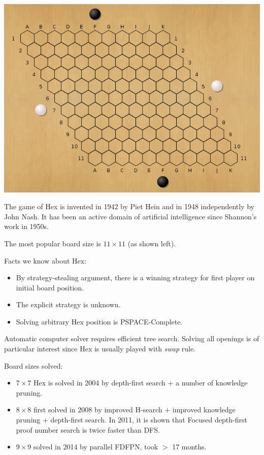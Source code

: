 \documentclass[a0,portrait]{a0poster}
\begin{document}
\begin{multicols}{3}
\begin{minipage}{0.5\linewidth}
\includegraphics[scale=0.5]{hexboard.png} \\
\end{minipage}
\begin{minipage}{0.5\linewidth}
The game of Hex is invented in 1942 by Piet Hein and in 1948 independently by John Nash. It has been an active domain of artificial intelligence since Shannon's work in 1950s.

The most popular board size is $11\times 11$ (as shown left).
\end{minipage}
Facts we know about Hex:
\begin{itemize}
\item By strategy-stealing argument, there is a winning strategy for first player on initial board position.
\item The explicit strategy is unknown.
\item Solving arbitrary Hex position is PSPACE-Complete.
\end{itemize}

Automatic computer solver requires efficient tree search. 
Solving all openings is of particular interest since Hex is usually played with \emph{swap} rule.

Board sizes solved:
\begin{itemize}
\item $7\times 7$ Hex is solved in 2004 by depth-first search + a number of knowledge pruning. 
\item $8 \times 8$ first solved in 2008 by improved H-search + improved knowledge pruning + depth-first search. In 2011, it is shown that Focused depth-first proof number search is twice faster than DFS.
\item $9 \times 9$ solved in 2014 by parallel FDFPN, took $>$ 17 months. 
\end{itemize}


\end{multicols}
\end{document}
